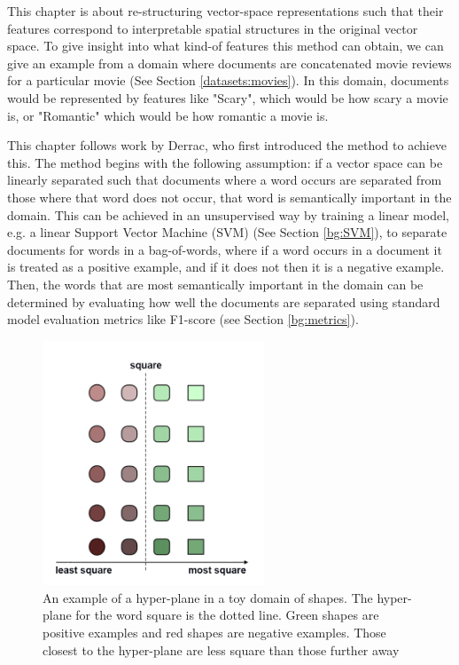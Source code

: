 

This chapter is about re-structuring vector-space representations such that  their  features correspond to interpretable spatial structures in the original vector space. To give insight into what kind-of features this method can obtain, we can give an example from a domain where documents are concatenated movie reviews for a particular movie (See Section \ref{datasets:movies}). In this domain, documents would be represented by features like "Scary", which would be how scary a movie is, or "Romantic" which would be how romantic a movie is.

This chapter follows work by Derrac\cite{Derrac2015}, who first introduced the method to achieve this. The method begins with the following assumption: if a vector space can be linearly separated such that documents where a word occurs are separated from those where that word does not occur, that word is semantically important in the domain. This can be achieved in an unsupervised way by training a linear model, e.g. a linear Support Vector Machine (SVM) (See Section \ref{bg:SVM}), to separate documents for words in a bag-of-words, where if a word occurs in a document it is treated as a positive example, and if it does not then it is a negative example. Then, the words that are most semantically important in the domain can be determined by evaluating how well the documents are separated using standard model evaluation metrics like F1-score (see Section \ref{bg:metrics}).

\begin{figure}[t]
	\includegraphics[width=250px]{images/Toyhyperplane1Direction.png}
	\centering
	\caption{An example of a hyper-plane in a toy domain of shapes. The hyper-plane for the word square is the dotted line. Green shapes are positive examples and red shapes are negative examples. Those closest to the hyper-plane are less square than those further away}\label{ch3:HyperPlaneNoDir}
\end{figure}



